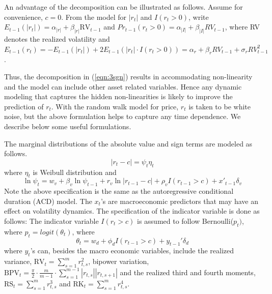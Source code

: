 An advantage of the decomposition can be illustrated as follows. Assume for convenience, $c = 0$. From the model for $|r_t|$ and $I(r_t > 0)$, write $E_{t-1}(\left|r_{t}\right|) = \alpha_{\left|r\right|} + \beta_{\left|r\right|}\text{RV}_{t-1}$ and $Pr_{t-1}(r_t >0) = \alpha_{\left|I\right|} + \beta_{\left|I\right|}RV_{t-1}$, where RV denotes the realized volatility and $E_{t-1}(r_t)= -E_{t-1}(\left|r_t \right|) + 2E_{t-1}(\left|r_{t}\right| \cdot I(r_{t} > 0))=\alpha_{r} + \beta_{r}RV_{t-1} + \sigma_{r} RV_{t-1}^2$.


Thus, the decomposition in (\ref{eqn:3sgn}) results in accommodating non-linearity and the model can include other asset related variables. Hence any dynamic modeling that captures the hidden non-linearities is likely to improve the prediction of $r_{t}$. With the random walk model for price, $r_t$ is taken to be white noise, but the above formulation helps to capture any time dependence. We describe below some useful formulations.


The marginal distributions of the absolute value and sign terms are modeled as follows.
	\begin{equation}\label{eqn:psieta}
	\left|r_{t} - c \right| = \psi_{t}\eta_{t}
	\end{equation}
where $\eta_{t}$ is Weibull distribution and
	\begin{equation}\label{eqn:lnspi}
	\ln{\psi_{t}} = w_{v} + \beta_{v}\ln{\psi_{t-1}} + r_{v}\ln{|r_{t-1}-c|} + \rho_{v}I(r_{t-1}>c) + x'_{t-1}\delta_{v}
	\end{equation}
Note the above specification is the same as the autoregressive conditional duration (ACD) model. The $x_{t}$'s  are macroeconomic predictors that may have an effect on volatility dynamics. The specification of the indicator variable is done as follows: The indicator variable $I(r_{t} > c)$ is assumed to follow Bernoulli($p_{t})$, where $p_{t} = logit(\theta_{t})$, where 
	\begin{equation}\label{eqn:3thetat}
	\theta_{t} = w_{d} + \phi_{d}I (r_{t-1}>c) + y_{t-1}'\delta_{d}
	\end{equation}
where $y_{t}$'s can, besides the macro economic variables, include the realized variance, $\text{RV}_{t} = \sum_{s=1}^{m} r^2_{t,s}$, bipower variation, $\text{BPV}_{t} = \frac{\pi}{2} \cdot \frac{m}{m-1} \cdot \sum_{s=1}^{m-1} \left|r_{t,s}\right| \left|r_{t,s+1}\right|$ and the realized third and fourth moments, $\text{RS}_{t} = \sum_{s=1}^m r_{t,s}^3$ and $\text{RK}_{t} = \sum_{s=1}^{m}r_{t,s}^4$.


